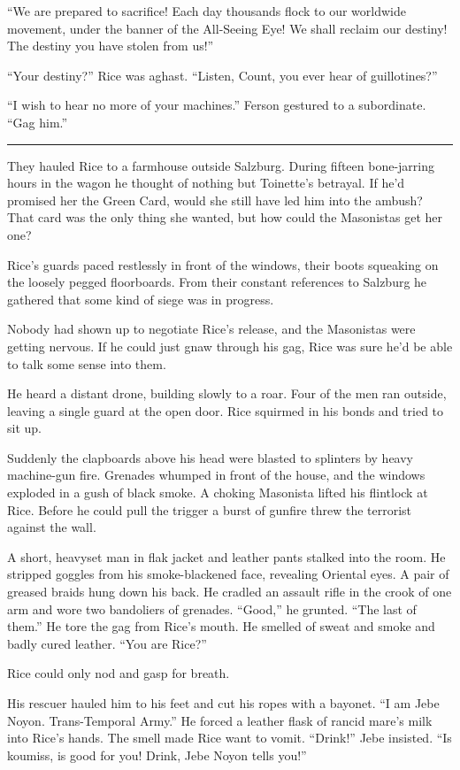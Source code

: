 ``We are prepared to sacrifice! Each day thousands flock to our worldwide movement, under the banner of the All-Seeing Eye! We shall reclaim our destiny! The destiny you have stolen from us!''

``Your destiny?'' Rice was aghast. ``Listen, Count, you ever hear of guillotines?''

``I wish to hear no more of your machines.'' Ferson gestured to a subordinate. ``Gag him.''

\fancybreak{* * *}

They hauled Rice to a farmhouse outside Salzburg. During fifteen bone-jarring hours in the wagon he thought of nothing but Toinette's betrayal. If he'd promised her the Green Card, would she still have led him into the ambush? That card was the only thing she wanted, but how could the Masonistas get her one?

Rice's guards paced restlessly in front of the windows, their boots squeaking on the loosely pegged floorboards. From their constant references to Salzburg he gathered that some kind of siege was in progress.

Nobody had shown up to negotiate Rice's release, and the Masonistas were getting nervous. If he could just gnaw through his gag, Rice was sure he'd be able to talk some sense into them.

He heard a distant drone, building slowly to a roar. Four of the men ran outside, leaving a single guard at the open door. Rice squirmed in his bonds and tried to sit up.

Suddenly the clapboards above his head were blasted to splinters by heavy machine-gun fire. Grenades whumped in front of the house, and the windows exploded in a gush of black smoke. A choking Masonista lifted his flintlock at Rice. Before he could pull the trigger a burst of gunfire threw the terrorist against the wall.

A short, heavyset man in flak jacket and leather pants stalked into the room. He stripped goggles from his smoke-blackened face, revealing Oriental eyes. A pair of greased braids hung down his back. He cradled an assault rifle in the crook of one arm and wore two bandoliers of grenades. ``Good,'' he grunted. ``The last of them.'' He tore the gag from Rice's mouth. He smelled of sweat and smoke and badly cured leather. ``You are Rice?''

Rice could only nod and gasp for breath.

His rescuer hauled him to his feet and cut his ropes with a bayonet. ``I am Jebe Noyon. Trans-Temporal Army.'' He forced a leather flask of rancid mare's milk into Rice's hands. The smell made Rice want to vomit. ``Drink!'' Jebe insisted. ``Is koumiss, is good for you! Drink, Jebe Noyon tells you!''

